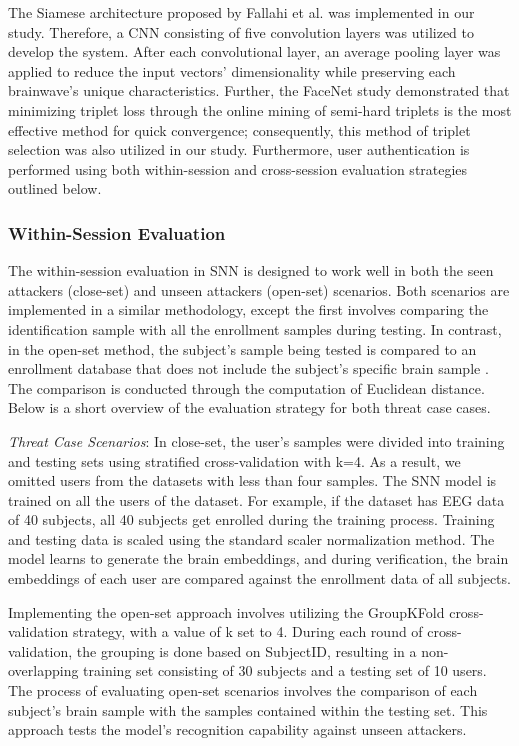The Siamese architecture proposed by Fallahi et al. \cite{fallahi2023brainnet} was implemented in our study. Therefore, a CNN consisting of five convolution layers was utilized to develop the system. After each convolutional layer, an average pooling layer was applied to reduce the input vectors' dimensionality while preserving each brainwave's unique characteristics. Further, the FaceNet study \cite{facenet} demonstrated that minimizing triplet loss through the online mining of semi-hard triplets is the most effective method for quick convergence; consequently, this method of triplet selection was also utilized in our study. Furthermore, user authentication is performed using both within-session and cross-session evaluation strategies outlined below.  

\subsubsection{Within-Session Evaluation}
The within-session evaluation in SNN is designed to work well in both the seen attackers (close-set) and unseen attackers (open-set) scenarios. Both scenarios are implemented in a similar methodology, except the first involves comparing the identification sample with all the enrollment samples during testing. In contrast, in the open-set method, the subject's sample being tested is compared to an enrollment database that does not include the subject's specific brain sample \cite{fallahi2023brainnet}. The comparison is conducted through the computation of Euclidean distance. Below is a short overview of the evaluation strategy for both threat case cases.
\smallskip

\textit{Threat Case Scenarios}: In close-set, the user's samples were divided into training and testing sets using stratified cross-validation with k=4. As a result, we omitted users from the datasets with less than four samples. The SNN model is trained on all the users of the dataset. For example, if the dataset has EEG data of 40 subjects, all 40 subjects get enrolled during the training process. Training and testing data is scaled using the standard scaler normalization method. The model learns to generate the brain embeddings, and during verification, the brain embeddings of each user are compared against the enrollment data of all subjects. 
\smallskip

Implementing the open-set approach involves utilizing the GroupKFold cross-validation strategy, with a value of k set to 4. During each round of cross-validation, the grouping is done based on SubjectID, resulting in a non-overlapping training set consisting of 30 subjects and a testing set of 10 users. The process of evaluating open-set scenarios involves the comparison of each subject's brain sample with the samples contained within the testing set. This approach tests the model's recognition capability against unseen attackers.
\smallskip

